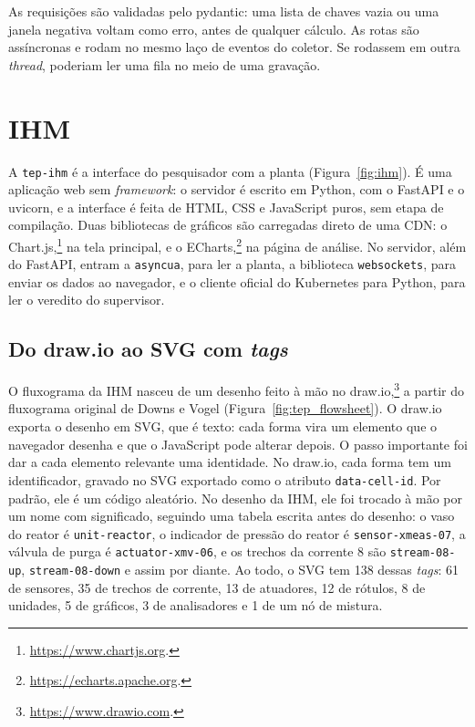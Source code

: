 As requisições são validadas pelo pydantic: uma lista de chaves vazia ou uma janela negativa voltam como erro, antes de qualquer cálculo. As rotas são assíncronas e rodam no mesmo laço de eventos do coletor. Se rodassem em outra \textit{thread}, poderiam ler uma fila no meio de uma gravação.

\section{IHM}
\label{sec:ihm}

A \texttt{tep-ihm} é a interface do pesquisador com a planta (Figura~\ref{fig:ihm}). É uma aplicação web sem \textit{framework}: o servidor é escrito em Python, com o FastAPI e o uvicorn, e a interface é feita de HTML, CSS e JavaScript puros, sem etapa de compilação. Duas bibliotecas de gráficos são carregadas direto de uma CDN: o Chart.js,\footnote{\url{https://www.chartjs.org}.} na tela principal, e o ECharts,\footnote{\url{https://echarts.apache.org}.} na página de análise. No servidor, além do FastAPI, entram a \texttt{asyncua}, para ler a planta, a biblioteca \texttt{websockets}, para enviar os dados ao navegador, e o cliente oficial do Kubernetes para Python, para ler o veredito do supervisor.

\subsection{Do draw.io ao SVG com \textit{tags}}
\label{subsec:ihm_svg}

O fluxograma da IHM nasceu de um desenho feito à mão no draw.io,\footnote{\url{https://www.drawio.com}.} a partir do fluxograma original de Downs e Vogel (Figura~\ref{fig:tep_flowsheet}). O draw.io exporta o desenho em SVG, que é texto: cada forma vira um elemento que o navegador desenha e que o JavaScript pode alterar depois. O passo importante foi dar a cada elemento relevante uma identidade. No draw.io, cada forma tem um identificador, gravado no SVG exportado como o atributo \texttt{data-cell-id}. Por padrão, ele é um código aleatório. No desenho da IHM, ele foi trocado à mão por um nome com significado, seguindo uma tabela escrita antes do desenho: o vaso do reator é \texttt{unit-reactor}, o indicador de pressão do reator é \texttt{sensor-xmeas-07}, a válvula de purga é \texttt{actuator-xmv-06}, e os trechos da corrente 8 são \texttt{stream-08-up}, \texttt{stream-08-down} e assim por diante. Ao todo, o SVG tem 138 dessas \textit{tags}: 61 de sensores, 35 de trechos de corrente, 13 de atuadores, 12 de rótulos, 8 de unidades, 5 de gráficos, 3 de analisadores e 1 de um nó de mistura.

